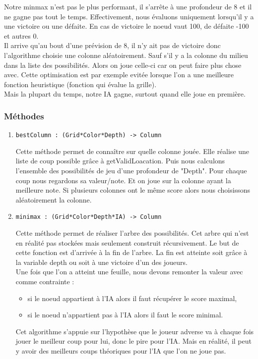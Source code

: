 \documentclass[11pt]{article}
\begin{document}
Notre minmax n'est pas le plus performant, il s'arrête à une profondeur de 8
et il ne gagne pas tout le temps. Effectivement, nous évaluons uniquement
lorsqu'il y a une victoire ou une défaite. En cas de victoire le noeud vaut
100, de défaite -100 et autres 0.\\

Il arrive qu'au bout d'une prévision de 8, il n'y ait pas de victoire donc
l'algorithme choisie une colonne aléatoirement. Sauf s'il y a la colonne du
milieu dans la liste des possibilités. Alors on joue celle-ci car on peut
faire plus chose avec. Cette optimisation est par exemple evitée lorsque
l'on a une meilleure fonction heuristique (fonction qui évalue la grille).\\

Mais la plupart du temps, notre IA gagne, surtout quand elle joue en
première.\\

\subsubsection{Méthodes}
\label{sec:org8c32872}

\begin{enumerate}
\item \texttt{bestColumn : (Grid*Color*Depth) -> Column}
\label{sec:orgb8dfda3}

Cette méthode permet de connaître sur quelle colonne jouée. 
Elle réalise une liste de coup possible grâce à getValidLoacation.
Puis nous calculons l'ensemble des possibilités de jeu d'une profondeur de
"Depth". 
Pour chaque coup nous regardons sa valeur/note. Et on joue sur la colonne
ayant la meilleure note. Si plusieurs colonnes ont le même score alors nous
choisissons aléatoirement la colonne.\\

\item \texttt{minimax : (Grid*Color*Depth*IA) -> Column}
\label{sec:org7d567d3}

Cette méthode permet de réaliser l'arbre des possibilités. Cet arbre qui
n'est en réalité pas stockées mais seulement construit récursivement. Le
but de cette fonction est d'arrivée à la fin de l'arbre. La fin est
atteinte soit grâce à la variable depth ou soit à une victoire d'un des
joueurs.\\

Une fois que l'on a atteint une feuille, nous devons remonter la valeur
avec comme contrainte :
\begin{itemize}
\item si le noeud appartient à l'IA alors il faut récupérer le score maximal,
\item si le noeud n'appartient pas à l'IA alors il faut le score minimal.\\
\end{itemize}

Cet algorithme s'appuie sur l'hypothèse que le  joueur adverse va à chaque
fois jouer le meilleur coup pour lui, donc le pire pour l'IA. Mais en
réalité, il peut y avoir des meilleurs coups théoriques pour l'IA que l'on
ne joue pas.\\
\end{enumerate}
\end{document}
